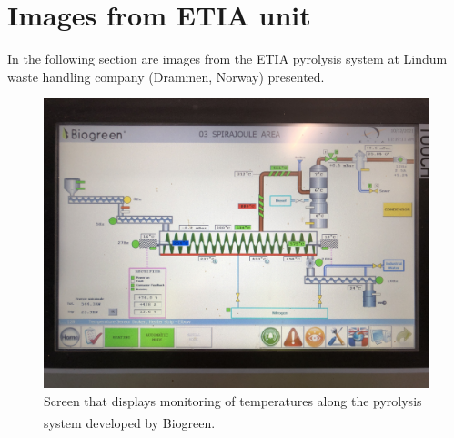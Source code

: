 \chapter{Images from ETIA unit}\label{appSec:ETIA} 

In the following section are images from the ETIA pyrolysis system at Lindum waste handling company (Drammen, Norway) presented. 


\begin{figure}
    \centering
    \includegraphics[width=0.7\linewidth,scale=0.7]{Bilder/Pyrolysis/Screen.png}
    \caption{Screen that displays monitoring of temperatures along the pyrolysis system developed by Biogreen\textsuperscript{\textregistered}.}
    \label{appFig:screen}
\end{figure}

